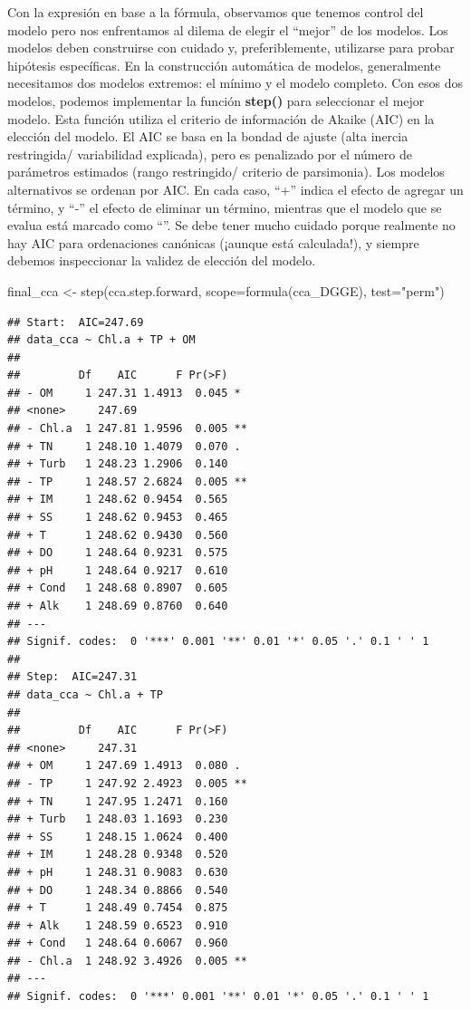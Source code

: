 \documentclass[
]{book}
\newenvironment{Shaded}{\begin{snugshade}}{\end{snugshade}}
\newcommand{\AttributeTok}[1]{\textcolor[rgb]{0.77,0.63,0.00}{#1}}
\newcommand{\FunctionTok}[1]{\textcolor[rgb]{0.00,0.00,0.00}{#1}}
\newcommand{\NormalTok}[1]{#1}
\newcommand{\OtherTok}[1]{\textcolor[rgb]{0.56,0.35,0.01}{#1}}
\newcommand{\StringTok}[1]{\textcolor[rgb]{0.31,0.60,0.02}{#1}}
\begin{document}
Con la expresión en base a la fórmula, observamos que tenemos control del modelo pero nos enfrentamos al dilema de elegir el ``mejor'' de los modelos.
Los modelos deben construirse con cuidado y, preferiblemente, utilizarse para probar
hipótesis específicas. En la construcción automática de modelos, generalmente necesitamos dos modelos extremos: el mínimo y el modelo completo. Con esos dos modelos, podemos implementar la función \textbf{step()} para seleccionar el mejor modelo. Esta función utiliza el criterio de información de Akaike (AIC) en la elección del modelo. El AIC se basa en la bondad de ajuste (alta inercia restringida/ variabilidad explicada), pero es penalizado por el número de parámetros estimados (rango restringido/ criterio de parsimonia). Los modelos alternativos se ordenan por AIC. En cada caso, ``+'' indica el efecto de agregar un término, y ``-'' el efecto de eliminar un término, mientras que el modelo que se evalua está marcado como ``''. Se debe tener mucho cuidado porque realmente no hay AIC para ordenaciones canónicas (¡aunque está calculada!), y siempre debemos inspeccionar la validez de elección del modelo.

\begin{Shaded}
\begin{Highlighting}[]
\NormalTok{final\_cca }\OtherTok{\textless{}{-}} \FunctionTok{step}\NormalTok{(cca.step.forward, }\AttributeTok{scope=}\FunctionTok{formula}\NormalTok{(cca\_DGGE), }\AttributeTok{test=}\StringTok{"perm"}\NormalTok{)}
\end{Highlighting}
\end{Shaded}

\begin{verbatim}
## Start:  AIC=247.69
## data_cca ~ Chl.a + TP + OM
## 
##         Df    AIC      F Pr(>F)   
## - OM     1 247.31 1.4913  0.045 * 
## <none>     247.69                 
## - Chl.a  1 247.81 1.9596  0.005 **
## + TN     1 248.10 1.4079  0.070 . 
## + Turb   1 248.23 1.2906  0.140   
## - TP     1 248.57 2.6824  0.005 **
## + IM     1 248.62 0.9454  0.565   
## + SS     1 248.62 0.9453  0.465   
## + T      1 248.62 0.9430  0.560   
## + DO     1 248.64 0.9231  0.575   
## + pH     1 248.64 0.9217  0.610   
## + Cond   1 248.68 0.8907  0.605   
## + Alk    1 248.69 0.8760  0.640   
## ---
## Signif. codes:  0 '***' 0.001 '**' 0.01 '*' 0.05 '.' 0.1 ' ' 1
## 
## Step:  AIC=247.31
## data_cca ~ Chl.a + TP
## 
##         Df    AIC      F Pr(>F)   
## <none>     247.31                 
## + OM     1 247.69 1.4913  0.080 . 
## - TP     1 247.92 2.4923  0.005 **
## + TN     1 247.95 1.2471  0.160   
## + Turb   1 248.03 1.1693  0.230   
## + SS     1 248.15 1.0624  0.400   
## + IM     1 248.28 0.9348  0.520   
## + pH     1 248.31 0.9083  0.630   
## + DO     1 248.34 0.8866  0.540   
## + T      1 248.49 0.7454  0.875   
## + Alk    1 248.59 0.6523  0.910   
## + Cond   1 248.64 0.6067  0.960   
## - Chl.a  1 248.92 3.4926  0.005 **
## ---
## Signif. codes:  0 '***' 0.001 '**' 0.01 '*' 0.05 '.' 0.1 ' ' 1
\end{verbatim}
\end{document}
